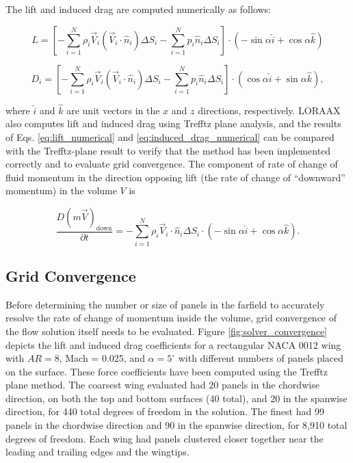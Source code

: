 \documentclass[11pt]{article}
\begin{document}
The lift and induced drag are computed numerically as follows:

\begin{equation}
L = \left[-\sum_{i=1}^N\rho_i\vec{V}_i(\vec{V}_i\cdot\hat{n}_i)\Delta S_i -
           \sum_{i=1}^N p_i\hat{n}_i\Delta S_i\right]
    \cdot(-\sin\alpha\hat{i} + \cos\alpha\hat{k})
\label{eq:lift_numerical}
\end{equation}

\begin{equation}
D_i= \left[-\sum_{i=1}^N\rho_i\vec{V}_i(\vec{V}_i\cdot\hat{n}_i)\Delta S_i -
           \sum_{i=1}^N p_i\hat{n}_i\Delta S_i\right]
      \cdot(\cos\alpha\hat{i} + \sin\alpha\hat{k}),
\label{eq:induced_drag_numerical}
\end{equation}

\noindent where $\hat{i}$ and $\hat{k}$ are unit vectors in the $x$ and $z$
directions, respectively.
LORAAX also computes lift and induced drag using Trefftz plane analysis, and the
results of Eqs. \ref{eq:lift_numerical} and \ref{eq:induced_drag_numerical} can
be compared with the Trefftz-plane result to verify that the method has been
implemented correctly and to evaluate grid convergence. The component of rate of
change of fluid momentum in the direction opposing lift (the rate of change of
``downward'' momentum) in the volume $V$ is

\begin{equation}
\frac{D(m\vec{V})_\text{down}}{\partial t} = 
-\sum_{i=1}^N \rho_i\vec{V}_i\cdot\hat{n}_i\Delta S_i
\cdot(-\sin\alpha\hat{i} + \cos\alpha\hat{k}).
\label{eq:downward_momrate}
\end{equation}

\subsection{Grid Convergence}\label{sec:grid_convergence}

Before determining the number or size of panels in the farfield to accurately
resolve the rate of change of momentum inside the volume, grid convergence of
the flow solution itself needs to be evaluated. Figure \ref{fig:solver_convergence}
depicts the lift and induced drag coefficients for a rectangular NACA 0012 wing
with $AR = 8$, Mach = 0.025, and $\alpha = 5^\circ$ with different numbers of
panels placed on the surface.
These force coefficients have been computed using the Trefftz plane method.
The coarsest wing evaluated had 20 panels in the chordwise direction, on both
the top and bottom surfaces (40 total), and 20 in the spanwise direction, for
440 total degrees of freedom in the solution. The finest had 99 panels in the
chordwise direction and 90 in the spanwise direction, for 8,910 total degrees
of freedom. Each wing had panels clustered closer together near the leading
and trailing edges and the wingtips.
\end{document}
